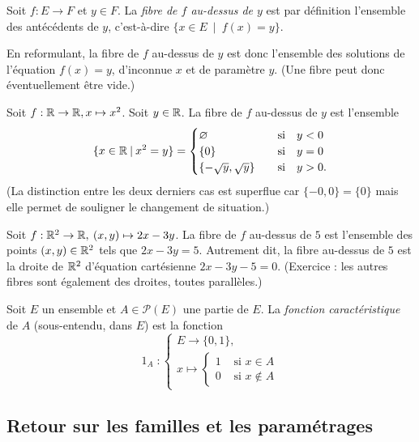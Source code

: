 \begin{definition}
Soit $f : E\to F$ et $y\in F$. La \emph{fibre de $f$ au-dessus de $y$} est par définition l'ensemble des antécédents de $y$, c'est-à-dire $\{x\in E \:\mid\: f(x)=y\}$.

En reformulant, la fibre de $f$ au-dessus de $y$ est donc l'ensemble des solutions de l'équation $f(x)=y$, d'inconnue $x$ et de paramètre $y$. (Une fibre peut donc éventuellement être vide.)
\end{definition}

\begin{exemple}
Soit $f : \mathbb{R}\to \mathbb{R}, x\mapsto x^2$. Soit $y\in \mathbb{R}$. La fibre de $f$ au-dessus de $y$ est l'ensemble 
\[
\{x\in \mathbb{R}\:|\: x^2=y\} = 
\begin{cases}
\varnothing &\quad\text{si}\quad y<0\\
\{0\} & \quad\text{si}\quad y=0\\
\{-\sqrt y, \sqrt y\}& \quad\text{si}\quad y>0.
\end{cases}
\]
(La distinction entre les deux derniers cas est superflue car $\{-0,0\}=\{0\}$ mais elle permet de souligner le changement de situation.)
\end{exemple}

\begin{exemple}
Soit $f : \mathbb{R}^2\to \mathbb{R},\: (x,y)\mapsto 2x-3y$. La fibre de $f$ au-dessus de $5$ est l'ensemble des points $(x,y) \in \mathbb{R}^2$ tels que $2x-3y=5$. Autrement dit, la fibre au-dessus de $5$ est la droite de $\mathbb{R}^2$ d'équation cartésienne $2x-3y-5=0$. (Exercice : les autres fibres sont également des droites, toutes parallèles.)
\end{exemple}

\begin{definition}
Soit $E$ un ensemble et $A\in \mathcal P(E)$ une partie de $E$. La \emph{fonction caractéristique} de $A$ (sous-entendu, dans $E$) est la fonction 
\[
\operatorname{1}_A :\begin{cases}E \to \{0,1\},\\ x\mapsto \begin{cases}1&\text{ si } x\in A\\0&\text{ si } x\not\in A\end{cases}\end{cases}
\]
\end{definition}




\subsection{Retour sur les familles et les paramétrages}
\label{subsec-retour-parametrage-familles}

